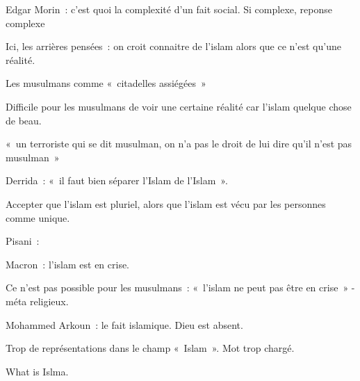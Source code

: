 Edgar Morin~: c'est quoi la complexité d'un fait social. Si complexe,
reponse complexe

Ici, les arrières pensées~: on croit connaitre de l'islam alors que ce
n'est qu'une réalité.

Les musulmans comme «~citadelles assiégées~»

Difficile pour les musulmans de voir une certaine réalité car l'islam
quelque chose de beau.

«~un terroriste qui se dit musulman, on n'a pas le droit de lui dire
qu'il n'est pas musulman~»

Derrida~: «~il faut bien séparer l'Islam de l'Islam~».

Accepter que l'islam est pluriel, alors que l'islam est vécu par les
personnes comme unique.

Pisani~:

Macron~: l'islam est en crise.

Ce n'est pas possible pour les musulmans~: «~l'islam ne peut pas être en
crise~» - méta religieux.

Mohammed Arkoun~: le fait islamique. Dieu est absent.

Trop de représentations dans le champ «~Islam~». Mot trop chargé.

What is Islma.
